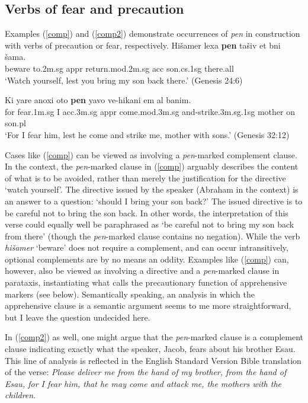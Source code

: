 \documentclass[output=paper,colorlinks,citecolor=brown]{langscibook}
\begin{document}
\subsection{Verbs of fear and precaution}
\label{subsec:verbsfp}
Examples (\ref{comp}) and (\ref{comp2}) demonstrate occurrences of \textit{pen} in construction with verbs of precaution or fear, respectively. 
\ea
\label{comp}
\gll Hišamer lexa \textbf{pen} tašiv et  bni šama. \\
beware to.{\sc  2m.sg} {\sc appr} return.{\sc mod.2m.sg} {\sc acc} son.{\sc cs.1sg} there.{\sc all} \\
\glt `Watch yourself, lest you bring my son back there.' (Genesis 24:6)
\z

\ea
\label{comp2}
\gll Ki yare anoxi oto \textbf{pen} yavo ve-hikani em al banim. \\
 for fear.{\sc 1m.sg} I {\sc acc.3m.sg} {\sc appr} come.{\sc mod.3m.sg} and-strike.{\sc 3m.sg.1sg} mother on son.{\sc pl} \\
\glt  `For I fear him, lest he come and strike me, mother with sons.' (Genesis 32:12)
\z

Cases like (\ref{comp}) can be viewed as involving a \textit{pen}-marked  complement clause. In the context, the \textit{pen}-marked clause in (\ref{comp}) arguably describes the content of what is to be avoided, rather than merely the justification for the directive `watch yourself'. The directive issued by the speaker (Abraham in the context) is an answer to a question: `should I bring your son back?' The issued directive is to be careful not to bring the son back. In other words, the interpretation of this verse could equally well be paraphrased as `be careful not to bring my son back from there' (though the \textit{pen}-marked clause contains no negation). While the verb \textit{hišamer} `beware' does not require a complement, and can occur intransitively, optional complements are by no means an oddity. Examples like (\ref{comp}) can, however, also be viewed as involving a directive and a \textit{pen}-marked clause in parataxis, instantiating what \citet{lichtenberk95} calls the precautionary function of apprehensive markers (see  below). Semantically speaking, an analysis in which the apprehensive clause is a semantic argument seems to me more straightforward, but I leave the question undecided here.
 
In (\ref{comp2}) as well, one might argue that the \textit{pen}-marked clause is a complement clause indicating exactly what the speaker, Jacob, fears about his brother Esau. This line of analysis is reflected in the English Standard Version Bible translation of the verse: \textit{ Please deliver me from the hand of my brother, from the hand of Esau, for I fear him, that he may come and attack me, the mothers with the children}.
\end{document}
